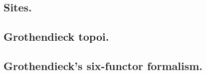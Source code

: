 \documentclass [11 pt, oneside] {article}
\begin{document}
\subsection{Sites.}

\subsection{Grothendieck topoi.}

\subsection{Grothendieck's six-functor formalism.}

\end{document}
